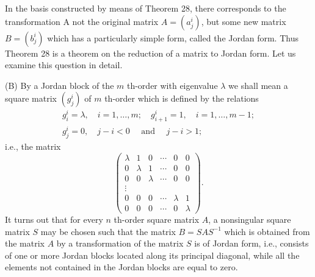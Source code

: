 \documentclass[10pt,a5paper]{book}
\makeatletter
\theoremstyle{plain}
\theoremstyle{definition}
\theoremstyle{remark}
\renewenvironment{proof}[1][\proofname]{\par
  \pushQED{\qed}%
  \normalfont\topsep6\p@\@plus6\p@\relax
  \trivlist
  \item\relax{\itshape #1\@addpunct{.}}\hspace\labelsep\ignorespaces
}{\popQED\endtrivlist\@endpefalse}
\makeatother
\begin{document}
\begin{proof}
In the basis constructed by means of Theorem 28, there corresponds to the transformation A not the original matrix $A=\left(a_{j}^{i}\right)$, but some new matrix $B=\left(b_{j}^{i}\right)$ which has a particularly simple form, called the Jordan form. Thus Theorem 28 is a theorem on the reduction of a matrix to Jordan form. Let us examine this question in detail.

(B) By a Jordan block of the $m$ th-order with eigenvalue $\lambda$ we shall mean a square matrix $\left(g_{j}^{i}\right)$ of $m$ th-order which is defined by the relations
\[
\begin{gathered}
g_{i}^{i}=\lambda, \quad i=1, \ldots, m ; \quad g_{i+1}^{i}=1, \quad i=1, \ldots, m-1 ; \\
g_{j}^{i}=0, \quad j-i<0 \quad \text { and } \quad j-i>1 ;
\end{gathered}
\]
i.e., the matrix
\[
\left(\begin{array}{llllll}
\lambda & 1 & 0 & \cdots & 0 & 0 \\
0 & \lambda & 1 & \cdots & 0 & 0 \\
0 & 0 & \lambda & \cdots & 0 & 0 \\
\vdots & & & & & \\
0 & 0 & 0 & \cdots & \lambda & 1 \\
0 & 0 & 0 & \cdots & 0 & \lambda
\end{array}\right) .
\]
It turns out that for every $n$ th-order square matrix $A$, a nonsingular square matrix $S$ may be chosen such that the matrix $B=S A S^{-1}$ which is obtained from the matrix $A$ by a transformation of the matrix $S$ is of Jordan form, i.e., consists of one or more Jordan blocks located along its principal diagonal, while all the elements not contained in the Jordan blocks are equal to zero.


\end{proof}
\end{document}
